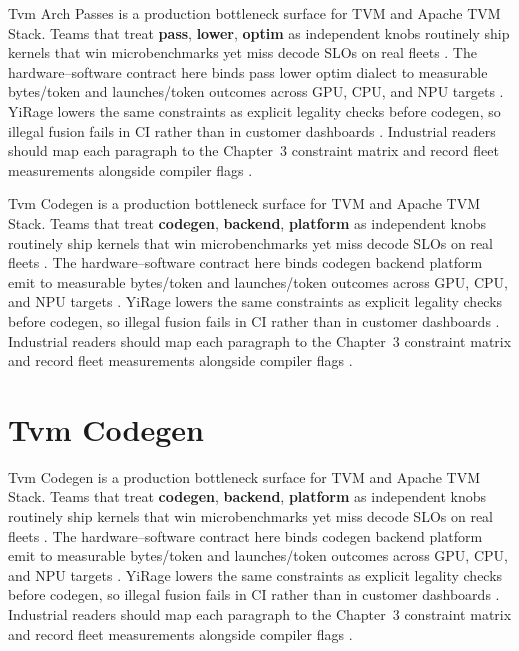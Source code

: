 Tvm Arch Passes is a production bottleneck surface for TVM and Apache TVM Stack. Teams that treat \textbf{pass}, \textbf{lower}, \textbf{optim} as independent knobs routinely ship kernels that win microbenchmarks yet miss decode SLOs on real fleets \citep{patel2025llminference,nvidia2022hopper}. The hardware--software contract here binds pass lower optim dialect to measurable bytes/token and launches/token outcomes across GPU, CPU, and NPU targets \citep{taxbreak2026,semianalysis2024tma}. YiRage lowers the same constraints as explicit legality checks before codegen, so illegal fusion fails in CI rather than in customer dashboards \citep{memoryfloor2026,amd2024xdna}. Industrial readers should map each paragraph to the Chapter~3 constraint matrix and record fleet measurements alongside compiler flags \citep{nvidia2022hopper,amd2024aie}.

Tvm Codegen is a production bottleneck surface for TVM and Apache TVM Stack. Teams that treat \textbf{codegen}, \textbf{backend}, \textbf{platform} as independent knobs routinely ship kernels that win microbenchmarks yet miss decode SLOs on real fleets \citep{taxbreak2026,semianalysis2024tma}. The hardware--software contract here binds codegen backend platform emit to measurable bytes/token and launches/token outcomes across GPU, CPU, and NPU targets \citep{memoryfloor2026,amd2024xdna}. YiRage lowers the same constraints as explicit legality checks before codegen, so illegal fusion fails in CI rather than in customer dashboards \citep{nvidia2022hopper,amd2024aie}. Industrial readers should map each paragraph to the Chapter~3 constraint matrix and record fleet measurements alongside compiler flags \citep{semianalysis2024tma,dlbook}.

\section{Tvm Codegen}
\label{sec:tvm_codegen}

Tvm Codegen is a production bottleneck surface for TVM and Apache TVM Stack. Teams that treat \textbf{codegen}, \textbf{backend}, \textbf{platform} as independent knobs routinely ship kernels that win microbenchmarks yet miss decode SLOs on real fleets \citep{memoryfloor2026,amd2024xdna}. The hardware--software contract here binds codegen backend platform emit to measurable bytes/token and launches/token outcomes across GPU, CPU, and NPU targets \citep{nvidia2022hopper,amd2024aie}. YiRage lowers the same constraints as explicit legality checks before codegen, so illegal fusion fails in CI rather than in customer dashboards \citep{semianalysis2024tma,dlbook}. Industrial readers should map each paragraph to the Chapter~3 constraint matrix and record fleet measurements alongside compiler flags \citep{amd2024xdna,dao2022flashattention}.


